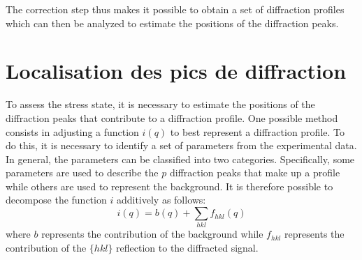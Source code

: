 \documentclass[french,a4paper]{report}
\begin{document}
The correction step thus makes it possible to obtain a set of diffraction profiles which can then be analyzed to estimate the positions of the diffraction peaks.

\section{Localisation des pics de diffraction}

To assess the stress state, it is necessary to estimate the positions of the diffraction peaks that contribute to a diffraction profile. One possible method consists in adjusting a function $i(q )$ to best represent a diffraction profile. To do this, it is necessary to identify a set of parameters from the experimental data. In general, the parameters can be classified into two categories. Specifically, some parameters are used to describe the $p$ diffraction peaks that make up a profile while others are used to represent the background. It is therefore possible to decompose the function $i$ additively as follows:
\begin{equation}
 i \left(q \right) = b \left(q  \right) + \sum_{hkl} f_{hkl} \left(q  \right)
\end{equation}
where $b$ represents the contribution of the background while $f_{hkl}$ represents the contribution of the $\{ hkl \}$ reflection to the diffracted signal.
\end{document}
